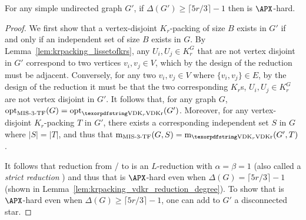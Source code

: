\begin{thm}
\label{thm:krpacking_vdkr_apxhard}
For any simple undirected graph $G'$, if $\Delta(G') \geq \lceil 5r/3 \rceil - 1$ then \vdkr is $\APX$-hard.
\end{thm}
\begin{proof}
We first show that a vertex-disjoint $K_r$-packing of size $B$ exists in $G'$ if and only if an independent set of size $B$ exists in $G$. By Lemma~\ref{lem:krpacking_lissetofkrs}, any $U_i, U_j \in K_r^G$ that are not vertex disjoint in $G'$ correspond to two vertices $v_i, v_j \in V$, which by the design of the reduction must be adjacent. Conversely, for any two $v_i, v_j \in V$ where $\{ v_i, v_j \} \in E$, by the design of the reduction it must be that the two corresponding $K_r$s, $U_i, U_j \in K_r^G$ are not vertex disjoint in $G'$. 
It follows that, for any graph $G$, $\textrm{opt}_{\textrm{\mistfvariant/}}(G) = \textrm{opt}_{\textrm{\vdkr}}(G')$. Moreover, for any vertex-disjoint $K_r$-packing $T$ in $G'$, there exists a corresponding independent set $S$ in $G$ where $|S|=|T|$, and thus that $\textrm{m}_{\textrm{\mistfvariant/}}(G, S) = \textrm{m}_{\textrm{\textrm{\vdkr}}}(G', T)$.

It follows that reduction from \mistfvariant/ to \vdkr is an $L$-reduction with $\alpha=\beta=1$ (also called a \emph{strict reduction} \cite{Crescenzi97}) and thus that \vdkr is $\APX$-hard even when $\Delta(G) = \lceil 5r/3 \rceil - 1$ (shown in Lemma~\ref{lem:krpacking_vdkr_reduction_degree}). To show that \vdkr is $\APX$-hard even when $\Delta(G) \geq \lceil 5r/3 \rceil - 1$, one can add to $G'$ a disconnected star.
\end{proof}

